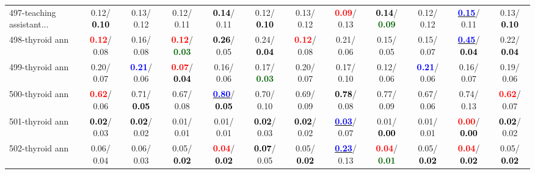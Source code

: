 \begin{table}[h]
\begin{center}
{\begin{tabular}{lc|c|c|c|c|c|c|c|c|c|c}
497-teaching assistant... &   0.12/\textcolor{black}{\textbf{  0.10}} &   0.13/  0.12 &   0.12/  0.11 & \textcolor{black}{\textbf{  0.14}}/  0.11 &   0.12/\textcolor{black}{\textbf{  0.10}} &   0.13/  0.12 & \textcolor{red}{\textbf{  0.09}}/  0.13 & \textcolor{black}{\textbf{  0.14}}/\textcolor{darkgreen}{\textbf{  0.09}} &   0.12/  0.12 & \underline{\textcolor{blue}{\textbf{  0.15}}}/  0.11 &   0.13/\textcolor{black}{\textbf{  0.10}} \\
498-thyroid ann & \textcolor{red}{\textbf{  0.12}}/  0.08 &   0.16/  0.08 & \textcolor{red}{\textbf{  0.12}}/\textcolor{darkgreen}{\textbf{  0.03}} & \textcolor{black}{\textbf{  0.26}}/  0.05 &   0.24/\textcolor{black}{\textbf{  0.04}} & \textcolor{red}{\textbf{  0.12}}/  0.08 &   0.21/  0.06 &   0.15/  0.05 &   0.15/  0.07 & \underline{\textcolor{blue}{\textbf{  0.45}}}/\textcolor{black}{\textbf{  0.04}} &   0.22/\textcolor{black}{\textbf{  0.04}} \\
499-thyroid ann &   0.20/  0.07 & \textcolor{blue}{\textbf{  0.21}}/  0.06 & \textcolor{red}{\textbf{  0.07}}/\textcolor{black}{\textbf{  0.04}} &   0.16/  0.06 &   0.17/\textcolor{darkgreen}{\textbf{  0.03}} &   0.20/  0.07 &   0.17/  0.10 &   0.12/  0.06 & \textcolor{blue}{\textbf{  0.21}}/  0.06 &   0.16/  0.07 &   0.19/  0.06 \\
500-thyroid ann & \textcolor{red}{\textbf{  0.62}}/  0.06 &   0.71/\textcolor{black}{\textbf{  0.05}} &   0.67/  0.08 & \underline{\textcolor{blue}{\textbf{  0.80}}}/\textcolor{black}{\textbf{  0.05}} &   0.70/  0.10 &   0.69/  0.09 & \textcolor{black}{\textbf{  0.78}}/  0.08 &   0.77/  0.09 &   0.67/  0.06 &   0.74/  0.13 & \textcolor{red}{\textbf{  0.62}}/  0.07 \\
501-thyroid ann & \textcolor{black}{\textbf{  0.02}}/  0.03 & \textcolor{black}{\textbf{  0.02}}/  0.02 &   0.01/  0.01 &   0.01/  0.01 & \textcolor{black}{\textbf{  0.02}}/  0.03 & \textcolor{black}{\textbf{  0.02}}/  0.02 & \underline{\textcolor{blue}{\textbf{  0.03}}}/  0.07 &   0.01/\textcolor{black}{\textbf{  0.00}} &   0.01/  0.01 & \textcolor{red}{\textbf{  0.00}}/\textcolor{black}{\textbf{  0.00}} & \textcolor{black}{\textbf{  0.02}}/  0.02 \\ \hline
502-thyroid ann &   0.06/  0.04 &   0.06/  0.03 &   0.05/\textcolor{black}{\textbf{  0.02}} & \textcolor{red}{\textbf{  0.04}}/\textcolor{black}{\textbf{  0.02}} & \textcolor{black}{\textbf{  0.07}}/  0.05 &   0.05/\textcolor{black}{\textbf{  0.02}} & \underline{\textcolor{blue}{\textbf{  0.23}}}/  0.13 & \textcolor{red}{\textbf{  0.04}}/\textcolor{darkgreen}{\textbf{  0.01}} &   0.05/\textcolor{black}{\textbf{  0.02}} & \textcolor{red}{\textbf{  0.04}}/\textcolor{black}{\textbf{  0.02}} &   0.05/\textcolor{black}{\textbf{  0.02}} \\

\end{tabular}}
\end{center}
\end{table}
